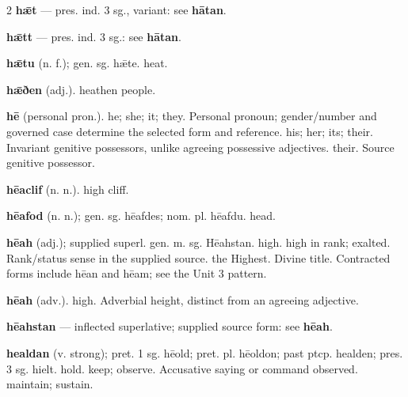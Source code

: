 \begin{multicols*}{2}
\textbf{hǣt} — pres. ind. 3 sg., variant: see \textbf{hātan}.\par
\textbf{hǣtt} — pres. ind. 3 sg.: see \textbf{hātan}.\par
\textbf{hǣtu} (n. f.); gen. sg. hǣte. heat.\par
\textbf{hǣðen} (adj.). heathen people.\par
\textbf{hē} (personal pron.). he; she; it; they. Personal pronoun; gender/number and governed case determine the selected form and reference. his; her; its; their. Invariant genitive possessors, unlike agreeing possessive adjectives. their. Source genitive possessor.\par
\textbf{hēaclif} (n. n.). high cliff.\par
\textbf{hēafod} (n. n.); gen. sg. hēafdes; nom. pl. hēafdu. head.\par
\textbf{hēah} (adj.); supplied superl. gen. m. sg. Hēahstan. high. high in rank; exalted. Rank/status sense in the supplied source. the Highest. Divine title. Contracted forms include hēan and hēam; see the Unit 3 pattern.\par
\textbf{hēah} (adv.). high. Adverbial height, distinct from an agreeing adjective.\par
\textbf{hēahstan} — inflected superlative; supplied source form: see \textbf{hēah}.\par
\textbf{healdan} (v. strong); pret. 1 sg. hēold; pret. pl. hēoldon; past ptcp. healden; pres. 3 sg. hielt. hold. keep; observe. Accusative saying or command observed. maintain; sustain.\par

\end{multicols*}
